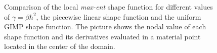 \documentclass{article}
\begin{document}
\begin{figure}
  \qquad
  \caption{Comparison of the local \textit{max-ent} shape function for
    different values of $\gamma = \beta h^2$, the piecewise linear shape function
    and the uniform GIMP shape function. The picture shows the nodal value
    of each shape function and its derivatives evaluated in a material
    point located in the center of the domain.}
  \label{fig:LME_MPM}
\end{figure}
\end{document}
